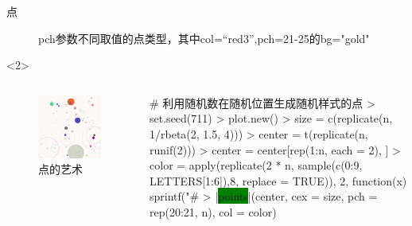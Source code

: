 \documentclass{beamerthemeMono}
\begin{document}
\begin{frame}[t,fragile]{\subsecname}{点}
\begin{overlayarea}{\textwidth}{\textheight}
{\begin{figure}
\begin{columns}
      \begin{column}{.4\textwidth}
        \centering
        \caption{pch参数不同取值的点类型，其中col=“red3”,pch=21-25的bg="gold"}
      \end{column}
    \end{columns}
\end{figure}}

\begin{onlyenv}<2>
  \begin{columns}
    \begin{column}{.4\textwidth}
\centering
\begin{figure}
  \includegraphics[width=\columnwidth]{points-art01.png}
  \caption{点的艺术}
\end{figure}
    \end{column}

    \begin{column}{.6\textwidth}
\centering
\begin{rcode}
# 利用随机数在随机位置生成随机样式的点
> set.seed(711)
> plot.new()
> size = c(replicate(n, 1/rbeta(2, 1.5, 4)))
> center = t(replicate(n, runif(2)))
> center = center[rep(1:n, each = 2), ]
> color = apply(replicate(2 * n, sample(c(0:9, LETTERS[1:6]),8, replace = TRUE)),
              2, function(x) sprintf("#%
> |\colorbox{green}{points}|(center, cex = size, pch = rep(20:21, n), col = color)
\end{rcode}
    \end{column}
  \end{columns}
\end{onlyenv}


\end{overlayarea}
\end{frame}
\end{document}
